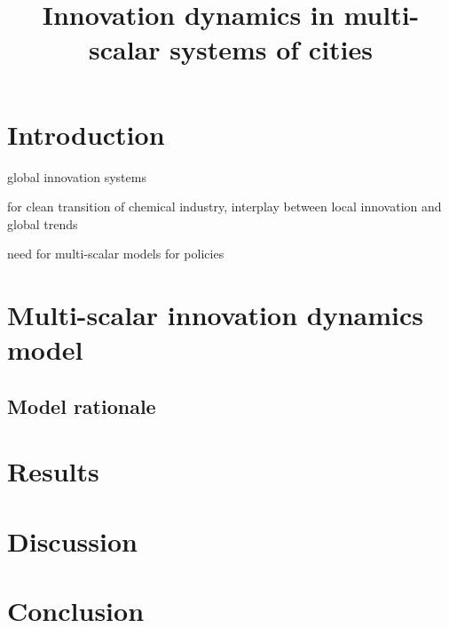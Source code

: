 \documentclass[letterpaper]{article}
\title{Innovation dynamics in multi-scalar systems of cities}
\author{}
\begin{document}
\maketitle

\begin{abstract}
  
\end{abstract}

\section{Introduction}



% 
\cite{binz2017global} global innovation systems

\cite{bauer2019local} for clean transition of chemical industry, interplay between local innovation and global trends

\cite{rozenblat2018conclusion} need for multi-scalar models for policies

\cite{rozenblat2007firm}


\cite{raimbault2021multiscale}

\cite{raimbault2021strong}


\cite{seth2010measuring} 

\cite{rosas2020reconciling}


\section{Multi-scalar innovation dynamics model}

\subsection{Model rationale}

\cite{raimbault2022innovation}

\cite{raimbault2020model}





\section{Results}



\section{Discussion}



\section{Conclusion}




\footnotesize

\end{document}
